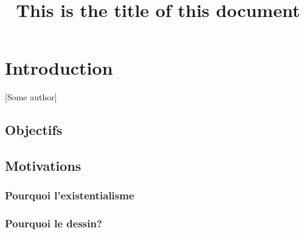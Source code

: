 \documentclass{RVTM}
\title{This is the title of this document}
\begin{document}
\rvtmtoc


\setcounter{page}{18}
\chapter{Introduction}

[Some author]

\section{Objectifs}


\lipsum[1]
 
\section{Motivations} 
 
\subsection{Pourquoi l’existentialisme}


\lipsum[2]

\hdottedline%
\begin{multicols}{2}
	\lipsum[3]
\end{multicols}
  


\subsection{Pourquoi le dessin?}

\lipsum[4]



\lipsum[1]


\begin{framedpage}
	{\centering%
	}
	\lipsum[1]
\end{framedpage}

\begin{blackpage}
	\lipsum[1]
\end{blackpage}
\end{document}
